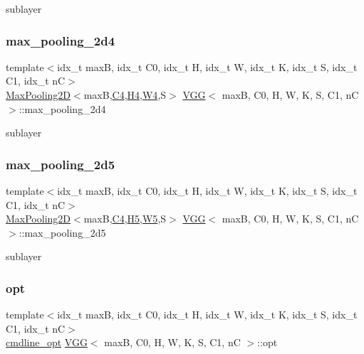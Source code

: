 sublayer \mbox{\label{structVGG_a0afbca6558a3efbad8a54c8d9c962d72}} 
\subsubsection{\texorpdfstring{max\+\_\+pooling\+\_\+2d4}{max\_pooling\_2d4}}
{\footnotesize\ttfamily template$<$idx\+\_\+t maxB, idx\+\_\+t C0, idx\+\_\+t H, idx\+\_\+t W, idx\+\_\+t K, idx\+\_\+t S, idx\+\_\+t C1, idx\+\_\+t nC$>$ \\
\hyperlink{structMaxPooling2D}{Max\+Pooling2D}$<$maxB,\hyperlink{structVGG_a4d54a1cc3e99340dfb67e7252719c663}{C4},\hyperlink{structVGG_a1754afced5b0bbb91031179c1f58ee29}{H4},\hyperlink{structVGG_a9728cd3ccfa5011d2a795dff7e9abfe8}{W4},S$>$ \hyperlink{structVGG}{V\+GG}$<$ maxB, C0, H, W, K, S, C1, nC $>$\+::max\+\_\+pooling\+\_\+2d4}

sublayer \mbox{\label{structVGG_a71a381756e7f6f60347d99d05b3f0b1a}} 
\subsubsection{\texorpdfstring{max\+\_\+pooling\+\_\+2d5}{max\_pooling\_2d5}}
{\footnotesize\ttfamily template$<$idx\+\_\+t maxB, idx\+\_\+t C0, idx\+\_\+t H, idx\+\_\+t W, idx\+\_\+t K, idx\+\_\+t S, idx\+\_\+t C1, idx\+\_\+t nC$>$ \\
\hyperlink{structMaxPooling2D}{Max\+Pooling2D}$<$maxB,\hyperlink{structVGG_a4d54a1cc3e99340dfb67e7252719c663}{C4},\hyperlink{structVGG_a763d01cce59fd355cbcfb7b09c3c8cdc}{H5},\hyperlink{structVGG_a01d04c8b89719716a0c45c3631765875}{W5},S$>$ \hyperlink{structVGG}{V\+GG}$<$ maxB, C0, H, W, K, S, C1, nC $>$\+::max\+\_\+pooling\+\_\+2d5}

sublayer \mbox{\label{structVGG_ad161d19c0d519768f32deca8dfd0598b}} 
\subsubsection{\texorpdfstring{opt}{opt}}
{\footnotesize\ttfamily template$<$idx\+\_\+t maxB, idx\+\_\+t C0, idx\+\_\+t H, idx\+\_\+t W, idx\+\_\+t K, idx\+\_\+t S, idx\+\_\+t C1, idx\+\_\+t nC$>$ \\
\hyperlink{structcmdline__opt}{cmdline\+\_\+opt} \hyperlink{structVGG}{V\+GG}$<$ maxB, C0, H, W, K, S, C1, nC $>$\+::opt}

